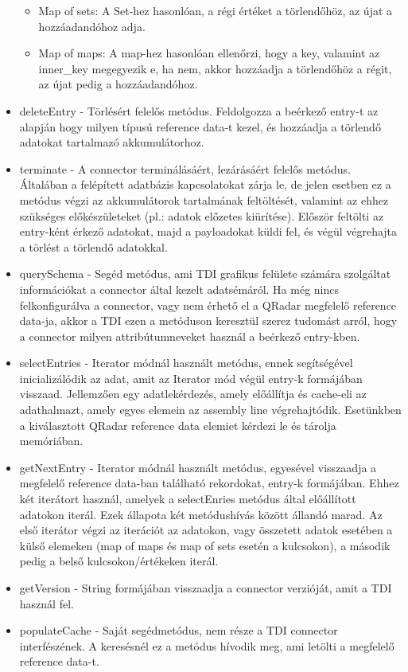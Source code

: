 \begin{itemize}
\begin{itemize}
		\item Map of sets: A Set-hez hasonlóan, a régi értéket a törlendőhöz, az újat a hozzáadandóhoz adja.
		
		\item Map of maps: A map-hez hasonlóan ellenőrzi, hogy a key, valamint az inner\_key megegyezik e, ha nem, akkor hozzáadja a törlendőhöz a régit, az újat pedig a hozzáadandóhoz.
	\end{itemize}

	\item deleteEntry - Törlésért felelős metódus. Feldolgozza a beérkező entry-t az alapján hogy milyen típusú reference data-t kezel, és hozzáadja a törlendő adatokat tartalmazó akkumulátorhoz.
	
	\item terminate - A connector terminálásáért, lezárásáért felelős metódus. Általában a felépített adatbázis kapcsolatokat zárja le, de jelen esetben ez a metódus végzi az akkumulátorok tartalmának feltöltését, valamint az ehhez szükséges előkészületeket (pl.: adatok előzetes kiürítése). Először feltölti az entry-ként érkező adatokat, majd a payloadokat küldi fel, és végül végrehajta a törlést a törlendő adatokkal.
	
	\item querySchema - Segéd metódus, ami TDI grafikus felülete számára szolgáltat információkat a connector által kezelt adatsémáról. Ha még nincs felkonfigurálva a connector, vagy nem érhető el a QRadar megfelelő reference data-ja, akkor a TDI ezen a metóduson keresztül szerez tudomást arról, hogy a connector milyen attribútumneveket használ a beérkező entry-kben.
		
	\item selectEntries - Iterator módnál használt metódus, ennek segítségével inicializálódik az adat, amit az Iterator mód végül entry-k formájában visszaad. Jellemzően egy adatlekérdezés, amely előállítja és cache-eli az adathalmazt, amely egyes elemein az assembly line végrehajtódik. Esetünkben a kiválasztott QRadar reference data elemiet kérdezi le és tárolja memóriában.
	
	\item getNextEntry - Iterator módnál használt metódus, egyesével visszaadja a megfelelő reference data-ban található rekordokat, entry-k formájában. Ehhez két iterátort használ, amelyek a selectEnries metódus által előállított adatokon iterál. Ezek állapota két metódushívás között állandó marad. Az első iterátor végzi az iterációt az adatokon, vagy összetett adatok esetében a külső elemeken (map of maps és map of sets esetén a kulcsokon), a második pedig a belső kulcsokon/értékeken iterál.
	
	\item getVersion - String formájában visszaadja a connector verzióját, amit a TDI használ fel.
	
	\item populateCache - Saját segédmetódus, nem része a TDI connector interfészének. A keresésnél ez a metódus hívodik meg, ami letölti a megfelelő reference data-t.

\end{itemize}


